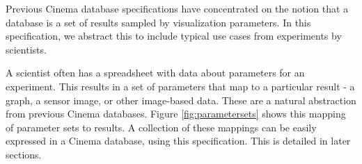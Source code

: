 Previous Cinema database specifications have concentrated on the notion that a database is a set of results sampled by visualization parameters. In this specification, we abstract this to include typical use cases from experiments by scientists. 

A scientist often has a spreadsheet with data about parameters for an experiment. This results in a set of parameters that map to a particular result - a graph, a sensor image, or other image-based data. These are a natural abstraction from previous Cinema databases. Figure \ref{fig:parametersets} shows this mapping of parameter sets to results. A collection of these mappings can be easily expressed in a Cinema database, using this specification. This is detailed in later sections.



